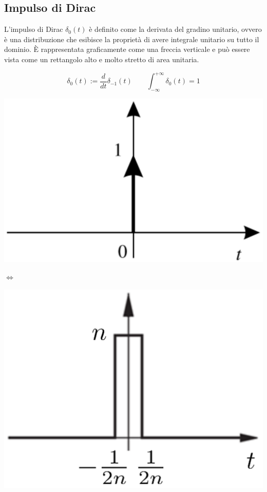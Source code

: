 \subsection{Impulso di Dirac}
L'impulso di Dirac \(\delta_0(t)\) è definito come la derivata del gradino unitario, ovvero è una distribuzione che esibisce la proprietà di
avere integrale unitario su tutto il dominio. È rappresentata graficamente come una freccia verticale e può essere vista come un
rettangolo alto e molto stretto di area unitaria.

\begin{center}
	\begin{minipage}{0.45\textwidth}
		\[\delta_0(t) := \frac{d}{dt}\delta_{-1}(t) \qquad \int_{-\infty}^{+\infty} \delta_0(t) = 1\]
	\end{minipage}
	\begin{minipage}{0.2\textwidth}
		\centering
		\includegraphics[width=\textwidth]{immagini/dirac1.png}
	\end{minipage}
	\begin{minipage}{0.05\textwidth}
		\centering
		\(\Leftrightarrow\)
	\end{minipage}
	\begin{minipage}{0.2\textwidth}
		\centering
		\includegraphics[width=\textwidth]{immagini/dirac2.png}
	\end{minipage}
\end{center}

